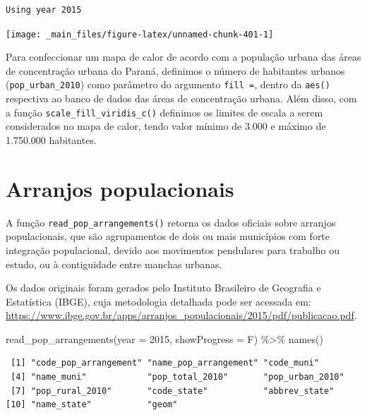 \documentclass[
  brazilian,
]{book}
\newenvironment{Shaded}{\begin{snugshade}}{\end{snugshade}}
\newcommand{\AttributeTok}[1]{\textcolor[rgb]{0.77,0.63,0.00}{#1}}
\newcommand{\DecValTok}[1]{\textcolor[rgb]{0.00,0.00,0.81}{#1}}
\newcommand{\FunctionTok}[1]{\textcolor[rgb]{0.00,0.00,0.00}{#1}}
\newcommand{\NormalTok}[1]{#1}
\newcommand{\SpecialCharTok}[1]{\textcolor[rgb]{0.00,0.00,0.00}{#1}}
\begin{document}
\begin{verbatim}
Using year 2015
\end{verbatim}

\begin{center}\texttt{[image: \_main\_files/figure-latex/unnamed-chunk-401-1]} \end{center}

Para confeccionar um mapa de calor de acordo com a população urbana das áreas de concentração urbana do Paraná, definimos o número de habitantes urbanos (\texttt{pop\_urban\_2010}) como parâmetro do argumento \texttt{fill\ =}, dentro da \texttt{aes()} respectiva ao banco de dados das áreas de concentração urbana. Além disso, com a função \texttt{scale\_fill\_viridis\_c()} definimos os limites de escala a serem considerados no mapa de calor, tendo valor mínimo de 3.000 e máximo de 1.750.000 habitantes.

\hypertarget{arranjos-populacionais}{%
\section{Arranjos populacionais}\label{arranjos-populacionais}}

A função \texttt{read\_pop\_arrangements()} retorna os dados oficiais sobre arranjos populacionais, que são agrupamentos de dois ou mais municípios com forte integração populacional, devido aos movimentos pendulares para trabalho ou estudo, ou à contiguidade entre manchas urbanas.

Os dados originais foram gerados pelo Instituto Brasileiro de Geografia e Estatística (IBGE), cuja metodologia detalhada pode ser acessada em: \url{https://www.ibge.gov.br/apps/arranjos_populacionais/2015/pdf/publicacao.pdf}.

\begin{Shaded}
\begin{Highlighting}[]
\FunctionTok{read\_pop\_arrangements}\NormalTok{(}\AttributeTok{year =} \DecValTok{2015}\NormalTok{, }\AttributeTok{showProgress =}\NormalTok{ F) }\SpecialCharTok{\%\textgreater{}\%} \FunctionTok{names}\NormalTok{()}
\end{Highlighting}
\end{Shaded}

\begin{verbatim}
 [1] "code_pop_arrangement" "name_pop_arrangement" "code_muni"           
 [4] "name_muni"            "pop_total_2010"       "pop_urban_2010"      
 [7] "pop_rural_2010"       "code_state"           "abbrev_state"        
[10] "name_state"           "geom"                
\end{verbatim}
\end{document}
